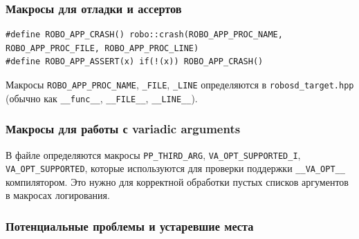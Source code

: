 \documentclass[a4paper,12pt]{article}
\begin{document}
\subsubsection{Макросы для отладки и ассертов}

\begin{lstlisting}[caption={Debug macros}]
#define ROBO_APP_CRASH() robo::crash(ROBO_APP_PROC_NAME, ROBO_APP_PROC_FILE, ROBO_APP_PROC_LINE)
#define ROBO_APP_ASSERT(x) if(!(x)) ROBO_APP_CRASH()
\end{lstlisting}

Макросы \texttt{ROBO\_APP\_PROC\_NAME}, \texttt{\_FILE}, \texttt{\_LINE} определяются в \texttt{robosd\_target.hpp} (обычно как \texttt{\_\_func\_\_}, \texttt{\_\_FILE\_\_}, \texttt{\_\_LINE\_\_}).

\subsubsection{Макросы для работы с variadic arguments}

В файле определяются макросы \texttt{PP\_THIRD\_ARG}, \texttt{VA\_OPT\_SUPPORTED\_I}, \texttt{VA\_OPT\_SUPPORTED}, которые используются для проверки поддержки \texttt{\_\_VA\_OPT\_\_} компилятором. Это нужно для корректной обработки пустых списков аргументов в макросах логирования.

\subsubsection{Потенциальные проблемы и устаревшие места}
\end{document}
